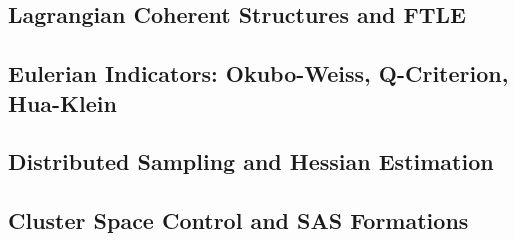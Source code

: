 \documentclass[lettersize,journal]{IEEEtran}
\begin{document}
\subsection{Lagrangian Coherent Structures and FTLE}


\subsection{Eulerian Indicators: Okubo-Weiss, Q-Criterion, Hua-Klein}


\subsection{Distributed Sampling and Hessian Estimation}


\subsection{Cluster Space Control and SAS Formations}
\end{document}
